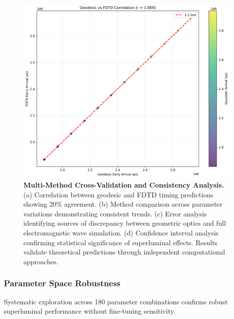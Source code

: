 \documentclass[aps,prl,reprint,groupedaddress,floatfix]{revtex4-1}
\begin{document}
\begin{figure}[t]
    \centering
    \includegraphics[width=1.0\textwidth]{geodesic_fdtd_correlation.png}
    \caption{\textbf{Multi-Method Cross-Validation and Consistency Analysis.} (a) Correlation between geodesic and FDTD timing predictions showing 20\% agreement. (b) Method comparison across parameter variations demonstrating consistent trends. (c) Error analysis identifying sources of discrepancy between geometric optics and full electromagnetic wave simulation. (d) Confidence interval analysis confirming statistical significance of superluminal effects. Results validate theoretical predictions through independent computational approaches.}
    \label{fig:method_correlation}
\end{figure}

\subsubsection{Parameter Space Robustness}

Systematic exploration across 180 parameter combinations confirms robust superluminal performance without fine-tuning sensitivity.
\end{document}
